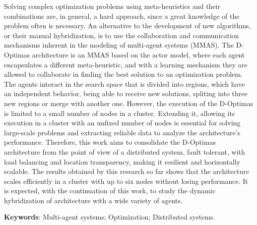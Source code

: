 \begin{resumo}[Abstract]
Solving complex optimization problems using meta-heuristics and their combinations are, in general, a hard approach, since a great knowledge of the problem often is necessary. An alternative to the development of new algorithms, or their manual hybridization, is to use the collaboration and communication mechanisms inherent in the modeling of multi-agent systems (MMAS). The D-Optimas architecture is an MMAS based on the actor model, where each agent encapsulates a different meta-heuristic, and with a learning mechanism they are allowed to collaborate in finding the best solution to an optimization problem. The agents interact in the search space that is divided into regions, which have an independent behavior, being able to receive new solutions, spliting into three new regions or merge with another one. However, the execution of the D-Optimas is limited to a small number of nodes in a cluster. Extending it, allowing its execution in a cluster with an unfixed number of nodes is essential for solving large-scale problems and extracting reliable data to analyze the architecture's performance. Therefore, this work aims to consolidate the D-Optimas architecture from the point of view of a distributed system, fault tolerant, with load balancing and location transparency, making it resilient and horizontally scalable. The results obtained by this research so far shows that the architecture scales efficiently in a cluster with up to six nodes without losing performance. It is expected, with the continuation of this work, to study the dynamic hybridization of architecture with a wide variety of agents.


\textbf{Keywords}: Multi-agent systems; Optimization; Distributed systems.
\end{resumo}